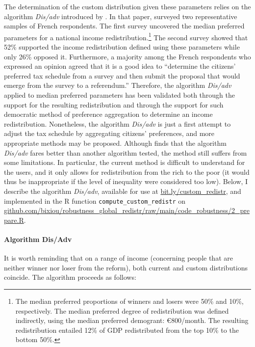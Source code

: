 The determination of the custom distribution given these parameters relies on the algorithm \textit{Dis/adv} introduced by \cite{fabre_french_2022}. In that paper, \cite{fabre_french_2022} surveyed two representative samples of French respondents. The first survey uncovered the median preferred parameters for a national income redistribution.\footnote{The median preferred proportions of winners and losers were 50\% and 10\%, respectively. The median preferred degree of redistribution was defined indirectly, using the median preferred demogrant: \euro{}800/month. The resulting redistribution entailed 12\% of GDP redistributed from the top 10\% to the bottom 50\%.} The second survey showed that 52\% supported the income redistribution defined using these parameters while only 26\% opposed it. Furthermore, a majority among the French respondents who expressed an opinion agreed that it is a good idea to ``determine the citizens' preferred tax schedule from a survey and then submit the proposal that would emerge from the survey to a referendum.'' Therefore, the algorithm \textit{Dis/adv} applied to median preferred parameters has been validated both through the support for the resulting redistribution and through the support for such democratic method of preference aggregation to determine an income redistribution. Nonetheless, the algorithm \textit{Dis/adv} is just a first attempt to adjust the tax schedule by aggregating citizens' preferences, and more appropriate methods may be proposed. Although \cite{fabre_french_2022} finds that the algorithm \textit{Dis/adv} fares better than another algorithm tested, the method still suffers from some limitations. In particular, the current method is difficult to understand for the users, and it only allows for redistribution from the rich to the poor (it would thus be inappropriate if the level of inequality were considered too low). Below, I describe the algorithm \textit{Dis/adv}, available for use at \href{https://adrien-fabre.com/custom_global_redistr.html}{bit.ly/custom\_redistr}, and implemented in the R function \verb|compute_custom_redistr| on \href{https://github.com/bixiou/robustness_global_redistr/raw/main/code_robustness/2_prepare.R}{github.com/bixiou/robustness\_global\_redistr/raw/main/code\_robustness/2\_prepare.R}.

\paragraph{Algorithm Dis/Adv} 

It is worth reminding that on a range of income (concerning people that are neither winner nor loser from the reform), both current and custom distributions coincide. The algorithm proceeds as follows:

